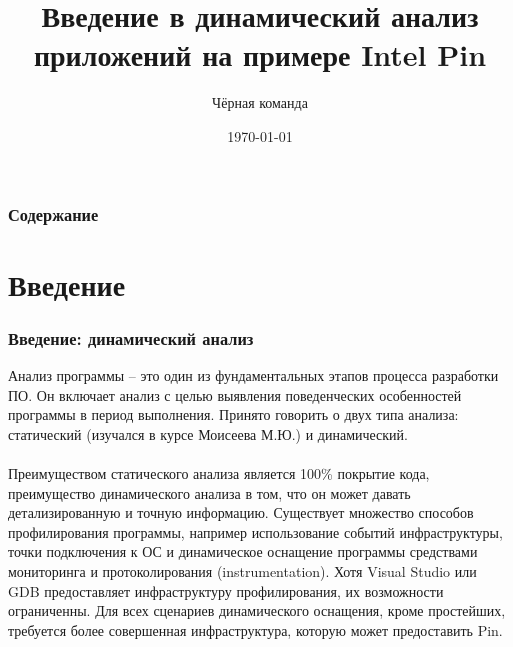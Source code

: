 \documentclass{beamer}
\title[Динамический анализ приложений]{Введение в динамический анализ приложений на примере Intel Pin} %
\author{Чёрная команда} %
\institute[СПбПУ] %
{
Санкт-Петербургский политехнический университет Петра Великого \\ %
\medskip
\textit{Антон Абрамов <abramov91@mail.ru>\\
Владислав Бусаров <happyfanik@yandex.ru>\\
Сергей Дедков <dsv.mail@yandex.ru>\\
Семён Мартынов <semen.martynov@gmail.com>\\
Николай Патраков <noon.vlg@gmail.com>} %
}
\date{\today} %
\begin{document}
\begin{frame}
\titlepage %
\end{frame}

\begin{frame}
\frametitle{Содержание} %
\tableofcontents %
\end{frame}


\section{Введение}

\begin{frame}
\frametitle{Введение: динамический анализ}
Анализ программы -- это один из фундаментальных этапов процесса разработки ПО. Он включает анализ с целью выявления поведенческих особенностей программы в период выполнения. Принято говорить о двух типа анализа: статический (изучался в курсе Моисеева М.Ю.) и динамический.\\~\\

Преимуществом статического анализа является 100\% покрытие кода, преимущество динамического анализа в том, что он может давать детализированную и точную информацию. Существует множество способов профилирования программы, например использование событий инфраструктуры, точки подключения к ОС и динамическое оснащение программы средствами мониторинга и протоколирования (instrumentation). Хотя Visual Studio или GDB предоставляет инфраструктуру профилирования, их возможности ограниченны. Для всех сценариев динамического оснащения, кроме простейших, требуется более совершенная инфраструктура, которую может предоставить Pin.
\end{frame}
\end{document}
